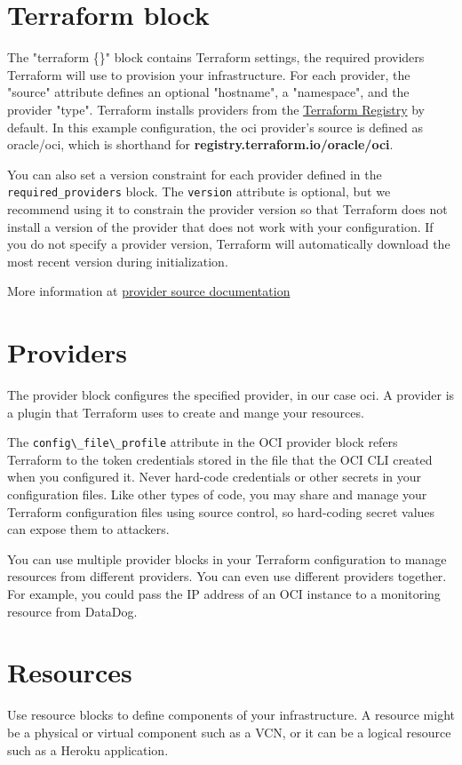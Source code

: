 \documentclass[../main.tex]{subfiles}
\begin{document}
\section{Terraform block}
The "terraform \{\}" block contains Terraform settings, the required providers Terraform will use to provision your infrastructure.
For each provider, the "source" attribute defines an optional "hostname", a "namespace", and the provider "type". Terraform installs providers from the \href{https://registry.terraform.io}{Terraform Registry} by default. 
In this example configuration, the oci provider's source is defined as oracle/oci, which is shorthand for \textbf{registry.terraform.io/oracle/oci}.

You can also set a version constraint for each provider defined in the \lstinline{required_providers} block.
The \lstinline{version} attribute is optional, but we recommend using it to constrain the provider version so that Terraform does not install a version of the provider that does not work with your configuration. 
If you do not specify a provider version, Terraform will automatically download the most recent version during initialization.

More information at \href{https://developer.hashicorp.com/terraform/language/providers/requirements}{provider source documentation}


\section{Providers}
The provider block configures the specified provider, in our case oci. A provider is a plugin that Terraform uses to create and mange your resources.

The \lstinline{config\_file\_profile} attribute in the \gls{OCI} provider block refers Terraform to the token credentials stored in the file that the \gls{OCI} \gls{CLI} created when you configured it. Never hard-code credentials or other secrets in your configuration files. Like other types of code, you may share and manage your Terraform configuration files using source control, so hard-coding secret values can expose them to attackers.

You can use multiple provider blocks in your Terraform configuration to manage resources from different providers. You can even use different providers together. For example, you could pass the \gls{IP} address of an \gls{OCI} instance to a monitoring resource from DataDog.

\section{Resources}
Use resource blocks to define components of your infrastructure. A resource might be a physical or virtual component such as a \gls{VCN}, or it can be a logical resource such as a Heroku application.
\end{document}
